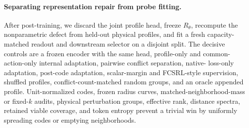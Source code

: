 \paragraph{Separating representation repair from probe fitting.}
After post-training, we discard the joint profile head, freeze $R_\theta$, recompute the
nonparametric defect from held-out physical profiles, and fit a fresh capacity-matched readout and
downstream selector on a disjoint split.  The decisive controls are a frozen encoder with the same
head, profile-only and common-action-only internal adaptation, pairwise conflict separation, native-
loss-only adaptation, post-code adaptation, scalar-margin and FCSRL-style supervision, shuffled
profiles, conflict-count-matched random groups, and an oracle appended profile.  Unit-normalized
codes, frozen radius curves, matched-neighborhood-mass or fixed-$k$ audits, physical perturbation
groups, effective rank, distance spectra, retained viable coverage, and token entropy prevent a
trivial win by uniformly spreading codes or emptying neighborhoods.
